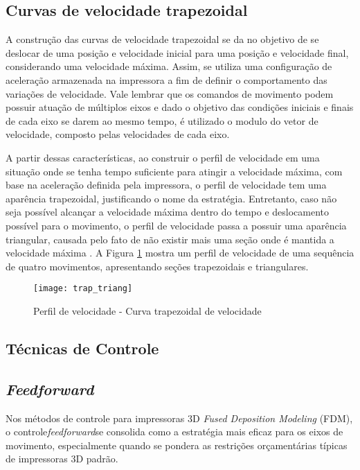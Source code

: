 \subsection{Curvas de velocidade trapezoidal}
A construção das curvas de velocidade trapezoidal se da no objetivo de se deslocar de uma posição e velocidade inicial para uma posição e velocidade final, considerando uma velocidade máxima. Assim, se utiliza uma configuração de aceleração armazenada na impressora a fim de definir o comportamento das variações de velocidade. Vale lembrar que os comandos de movimento podem possuir atuação de múltiplos eixos e dado o objetivo das condições iniciais e finais de cada eixo se darem ao mesmo tempo, é utilizado o modulo do vetor de velocidade, composto pelas velocidades de cada eixo.

A partir dessas características, ao construir o perfil de velocidade em uma situação onde se tenha tempo suficiente para atingir a velocidade máxima, com base na aceleração definida pela impressora, o perfil de velocidade tem uma aparência trapezoidal, justificando o nome da estratégia. Entretanto, caso não seja possível alcançar a velocidade máxima dentro do tempo e deslocamento possível para o movimento, o perfil de velocidade passa a possuir uma aparência triangular, causada pelo fato de não existir mais uma seção onde é mantida a velocidade máxima \cite{yu20,klipperkinematic}. A Figura \ref{fig:trap_triang} mostra um perfil de velocidade de uma sequência de quatro movimentos, apresentando seções trapezoidais e triangulares.

\begin{figure}[H]
    \centering
    \caption{Perfil de velocidade - Curva trapezoidal de velocidade}
    \texttt{[image: trap\_triang]}
    \label{fig:trap_triang}
\end{figure}


\subsection{Técnicas de Controle}

\subsection{\textit{Feedforward}}
Nos métodos de controle para impressoras 3D \textit{Fused Deposition Modeling} (FDM), o controle\textit{feedforward}se consolida como a estratégia mais eficaz para os eixos de movimento, especialmente quando se pondera as restrições orçamentárias típicas de impressoras 3D padrão.

